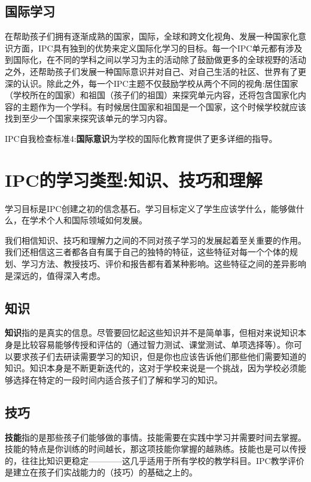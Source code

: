 \subsection{国际学习}
    在帮助孩子们拥有逐渐成熟的国家，国际，全球和跨文化视角、发展一种国家化意识方面，IPC具有独到的优势来定义国际化学习的目标。每一个IPC单元都有涉及到国际化，在不同的学科之间以学习为主的活动除了鼓励做更多的全球视野的活动之外，还帮助孩子们发展一种国际意识并对自己、对自己生活的社区、世界有了更深的认识。除此之外，每一个IPC主题不仅鼓励学校从两个不同的视角:居住国家（学校所在的国家）和祖国（孩子们的祖国）来探究单元内容，还将包含国家化内容的主题作为一个学科。有时候居住国家和祖国是一个国家，这个时候学校就应该找到至少一个国家来探究该单元的学习内容。\par
    IPC自我检查标准4:\textbf{国际意识}为学校的国际化教育提供了更多详细的指导。

\section{IPC的学习类型:知识、技巧和理解}
    学习目标是IPC创建之初的信念基石。学习目标定义了学生应该学什么，能够做什么，在学术个人和国际领域如何发展。\par
    我们相信知识、技巧和理解力之间的不同对孩子学习的发展起着至关重要的作用。我们还相信这三者都各自有属于自己的独特的特征，这些特征对每一个个体的规划、学习方法、教授技巧、评价和报告都有着某种影响。这些特征之间的差异影响是深远的，值得深入考虑。   \par
    

\subsection{知识}
    \textbf{知识}指的是真实的信息。尽管要回忆起这些知识并不是简单事，但相对来说知识本身是比较容易能够传授和评估的（通过智力测试、课堂测试、单项选择等）。你可以要求孩子们去研读需要学习的知识，但是你也应该告诉他们那些他们需要知道的知识。知识本身是不断更新迭代的，这对于学校来说是一个挑战，因为学校必须能够选择在特定的一段时间内适合孩子们了解和学习的知识。 \par

\subsection{技巧}
     \textbf{技能}指的是那些孩子们能够做的事情。技能需要在实践中学习并需要时间去掌握。技能的特点是你训练的时间越长，那这项技能你掌握的越熟练。技能也是可以传授的，往往比知识更稳定————这几乎适用于所有学校的教学科目。IPC教学评价是建立在孩子们实战能力的（技巧）的基础之上的。\par
 
